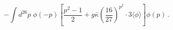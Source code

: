 \begin{equation}
-\int d^{26} p \;
\phi (-p) \left[ \frac{p^2 -1}{2}  + g \bar{\kappa} \left(
  \frac{16}{27}  \right)^{p^2} \cdot 3 \langle \phi \rangle \right]
\phi (p) \,.
\end{equation}

